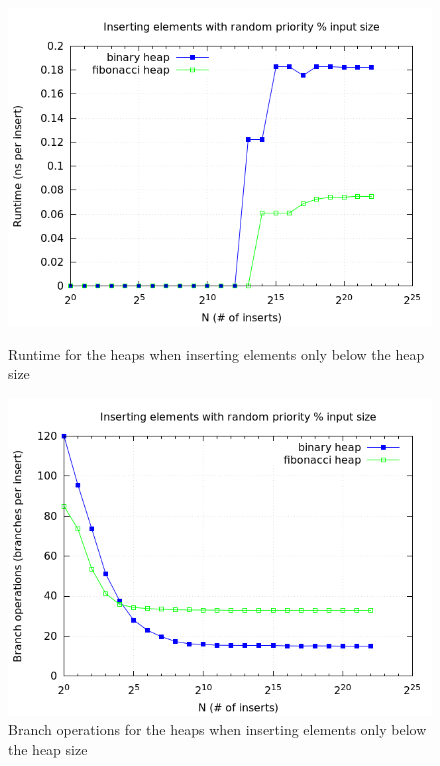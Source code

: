 \documentclass[a4paper,oneside,article,11pt]{memoir}
\begin{document}
\begin{figure}[H]
\centering
\begin{minipage}{0.48\columnwidth}
  \centering
  \includegraphics[width=\linewidth]{../res/inserts/insert_random_time_small.png}%
  \caption{Runtime for the heaps when inserting elements only below the heap size}
  \label{fig:insert_t_random_small}
\end{minipage}%
\hfill
\begin{minipage}{0.48\columnwidth}
  \centering
  \includegraphics[width=\linewidth]{../res/inserts/insert_random_branch_small.png}%
  \caption{Branch operations for the heaps when inserting elements only below the heap size}
  \label{fig:insert_b_random_small}
\end{minipage}
\end{figure}
\end{document}
